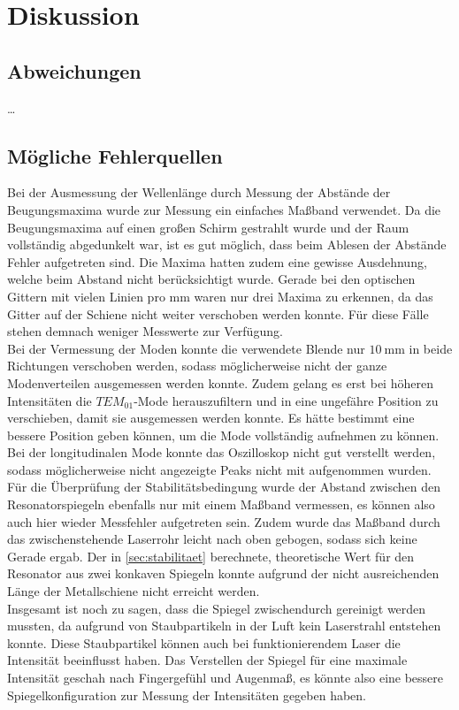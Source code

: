 \section{Diskussion}
\label{sec:diskussion}

\subsection{Abweichungen}

…


\subsection{Mögliche Fehlerquellen}

    Bei der Ausmessung der Wellenlänge durch Messung der Abstände der Beugungsmaxima wurde zur Messung ein einfaches Maßband verwendet.
    Da die Beugungsmaxima auf einen großen Schirm gestrahlt wurde und der Raum vollständig abgedunkelt war,
    ist es gut möglich,
    dass beim Ablesen der Abstände Fehler aufgetreten sind.
    Die Maxima hatten zudem eine gewisse Ausdehnung,
    welche beim Abstand nicht berücksichtigt wurde.
    Gerade bei den optischen Gittern mit vielen Linien pro $\si{\milli\meter}$ waren nur drei Maxima zu erkennen,
    da das Gitter auf der Schiene nicht weiter verschoben werden konnte.
    Für diese Fälle stehen demnach weniger Messwerte zur Verfügung.\\
    Bei der Vermessung der Moden konnte die verwendete Blende nur $\SI{10}{\milli\meter}$ in beide Richtungen verschoben werden,
    sodass möglicherweise nicht der ganze Modenverteilen ausgemessen werden konnte.
    Zudem gelang es erst bei höheren Intensitäten die $TEM_{01}$-Mode herauszufiltern und in eine ungefähre Position zu verschieben,
    damit sie ausgemessen werden konnte.
    Es hätte bestimmt eine bessere Position geben können,
    um die Mode vollständig aufnehmen zu können.
    Bei der longitudinalen Mode konnte das Oszilloskop nicht gut verstellt werden,
    sodass möglicherweise nicht angezeigte Peaks nicht mit aufgenommen wurden.\\
    Für die Überprüfung der Stabilitätsbedingung wurde der Abstand zwischen den Resonatorspiegeln ebenfalls nur mit einem Maßband vermessen,
    es können also auch hier wieder Messfehler aufgetreten sein.
    Zudem wurde das Maßband durch das zwischenstehende Laserrohr leicht nach oben gebogen,
    sodass sich keine Gerade ergab.
    Der in \autoref{sec:stabilitaet} berechnete,
    theoretische Wert für den Resonator aus zwei konkaven Spiegeln konnte aufgrund der nicht ausreichenden Länge der Metallschiene nicht erreicht werden.\\
    Insgesamt ist noch zu sagen,
    dass die Spiegel zwischendurch gereinigt werden mussten,
    da aufgrund von Staubpartikeln in der Luft kein Laserstrahl entstehen konnte.
    Diese Staubpartikel können auch bei funktionierendem Laser die Intensität beeinflusst haben.
    Das Verstellen der Spiegel für eine maximale Intensität geschah nach Fingergefühl und Augenmaß,
    es könnte also eine bessere Spiegelkonfiguration zur Messung der Intensitäten gegeben haben.

